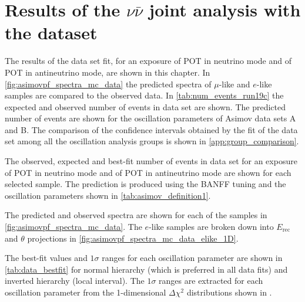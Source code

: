\clearpage

\section {Results of the $\nu\bar{\nu}$ joint analysis with the \RunPeriod dataset}
\label{sec:results}

The results of the \RunPeriod data set fit, for an exposure of \TotalPotNu POT in neutrino mode and of \TotalPotNuBar POT in antineutrino mode, are shown in this chapter. In \cref{fig:asimovpf_spectra_mc_data} the predicted spectra of $\mu$-like and $e$-like samples are compared to the observed data. In \cref{tab:num_events_run19c} the expected and observed number of events in \RunPeriod data set are shown. The predicted number of events are shown for the oscillation parameters of Asimov data sets A and B. The comparison of the confidence intervals obtained by the fit of the \RunPeriod data set among all the oscillation analysis groups is shown in \cref{app:group_comparison}.

\begin{table}[htb]
\centering
\begin{adjustbox}{width=\textwidth, totalheight=\textheight, keepaspectratio}

\end{adjustbox}
\caption{
The observed, expected and best-fit number of events in \RunPeriod data set for an exposure of \TotalPotNuRunOneEight POT in neutrino mode and of \TotalPotNuBarRunOneEight POT in antineutrino mode are shown 
for each selected sample. The prediction is produced using the BANFF tuning and the oscillation parameters shown in \cref{tab:asimov_definition1}.
}
\label{tab:num_events_run19c}
\end{table}

The predicted and observed spectra are shown for each of the samples in \cref{fig:asimovpf_spectra_mc_data}. The $e$-like samples are broken down into $E_\text{rec}$ and $\theta$ projections in \cref{fig:asimovpf_spectra_mc_data_elike_1D}.



The best-fit values and $1\sigma$ ranges for each oscillation parameter are shown in \cref{tab:data_bestfit} for normal hierarchy (which is preferred in all data fits) and inverted hierarchy (local interval). The $1\sigma$ ranges are extracted for each oscillation parameter from the 1-dimensional $\Delta \chi^2$ distributions shown in .

